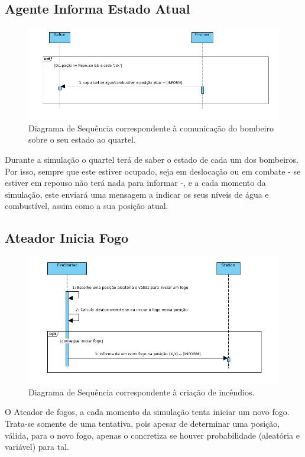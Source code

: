 \documentclass[a4paper]{article}
\begin{document}
\pagebreak
\subsection{Agente Informa Estado Atual}
\begin{figure}[!h]
    \centering
    \includegraphics[scale=0.4]{Agente_INforma_Estado_Atual.png}
    \caption{Diagrama de Sequência correspondente à comunicação do bombeiro sobre o seu estado ao quartel.}
\end{figure}
Durante a simulação o quartel terá de saber o estado de cada um dos bombeiros. Por isso, sempre que este estiver ocupado, seja em deslocação ou em combate - se estiver em repouso não terá nada para informar -, e a cada momento da simulação, este enviará uma mensagem a indicar os seus níveis de água e combustível, assim como a sua posição atual.

\subsection{Ateador Inicia Fogo}
\begin{figure}[!h]
    \centering
    \includegraphics[scale=0.4]{AteadorCriaFogo_V2.png}
    \caption{Diagrama de Sequência correspondente à criação de incêndios.}
\end{figure}
O Ateador de fogos, a cada momento da simulação tenta iniciar um novo fogo. Trata-se somente de uma tentativa, pois apesar de determinar uma posição, válida, para o novo fogo, apenas o concretiza se houver probabilidade (aleatória e variável) para tal.
\end{document}
